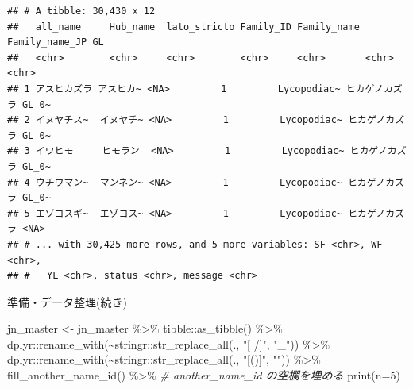 \documentclass[
  a5paper,
  landscape,
  notitlepage]{report}
\newenvironment{Shaded}{\begin{snugshade}}{\end{snugshade}}
\newcommand{\AttributeTok}[1]{\textcolor[rgb]{0.77,0.63,0.00}{#1}}
\newcommand{\CommentTok}[1]{\textcolor[rgb]{0.56,0.35,0.01}{\textit{#1}}}
\newcommand{\DecValTok}[1]{\textcolor[rgb]{0.00,0.00,0.81}{#1}}
\newcommand{\FunctionTok}[1]{\textcolor[rgb]{0.00,0.00,0.00}{#1}}
\newcommand{\NormalTok}[1]{#1}
\newcommand{\OtherTok}[1]{\textcolor[rgb]{0.56,0.35,0.01}{#1}}
\newcommand{\SpecialCharTok}[1]{\textcolor[rgb]{0.00,0.00,0.00}{#1}}
\newcommand{\StringTok}[1]{\textcolor[rgb]{0.31,0.60,0.02}{#1}}
\begin{document}
\begin{verbatim}
## # A tibble: 30,430 x 12
##   all_name     Hub_name  lato_stricto Family_ID Family_name Family_name_JP GL   
##   <chr>        <chr>     <chr>        <chr>     <chr>       <chr>          <chr>
## 1 アスヒカズラ アスヒカ~ <NA>         1         Lycopodiac~ ヒカゲノカズラ GL_0~
## 2 イヌヤチス~  イヌヤチ~ <NA>         1         Lycopodiac~ ヒカゲノカズラ GL_0~
## 3 イワヒモ     ヒモラン  <NA>         1         Lycopodiac~ ヒカゲノカズラ GL_0~
## 4 ウチワマン~  マンネン~ <NA>         1         Lycopodiac~ ヒカゲノカズラ GL_0~
## 5 エゾコスギ~  エゾコス~ <NA>         1         Lycopodiac~ ヒカゲノカズラ <NA> 
## # ... with 30,425 more rows, and 5 more variables: SF <chr>, WF <chr>,
## #   YL <chr>, status <chr>, message <chr>
\end{verbatim}

\newpage

\fontsize{32pt}{32pt}\selectfont

\begin{center}
準備・データ整理(続き)
\end{center}

\fontsize{14pt}{14pt}\selectfont

\begin{Shaded}
\begin{Highlighting}[]
\NormalTok{jn\_master }\OtherTok{\textless{}{-}} 
\NormalTok{  jn\_master }\SpecialCharTok{\%\textgreater{}\%}
\NormalTok{  tibble}\SpecialCharTok{::}\FunctionTok{as\_tibble}\NormalTok{() }\SpecialCharTok{\%\textgreater{}\%}
\NormalTok{  dplyr}\SpecialCharTok{::}\FunctionTok{rename\_with}\NormalTok{(}\SpecialCharTok{\textasciitilde{}}\NormalTok{stringr}\SpecialCharTok{::}\FunctionTok{str\_replace\_all}\NormalTok{(., }\StringTok{"[ /]"}\NormalTok{, }\StringTok{"\_"}\NormalTok{)) }\SpecialCharTok{\%\textgreater{}\%}
\NormalTok{  dplyr}\SpecialCharTok{::}\FunctionTok{rename\_with}\NormalTok{(}\SpecialCharTok{\textasciitilde{}}\NormalTok{stringr}\SpecialCharTok{::}\FunctionTok{str\_replace\_all}\NormalTok{(., }\StringTok{"[()]"}\NormalTok{, }\StringTok{""}\NormalTok{)) }\SpecialCharTok{\%\textgreater{}\%}
  \FunctionTok{fill\_another\_name\_id}\NormalTok{() }\SpecialCharTok{\%\textgreater{}\%} \CommentTok{\# another\_name\_id の空欄を埋める}
  \FunctionTok{print}\NormalTok{(}\AttributeTok{n=}\DecValTok{5}\NormalTok{)}
\end{Highlighting}
\end{Shaded}
\end{document}
